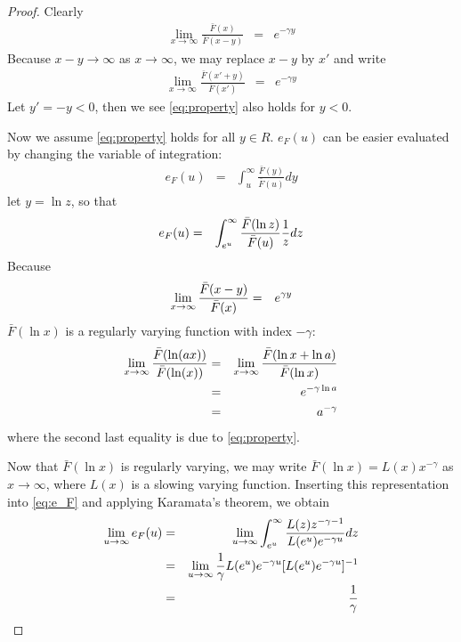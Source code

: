 \documentclass{report}
\begin{document}
\begin{enumerate}[1.]
\begin{enumerate}[(a)]
\begin{proof}
      Clearly
      \begin{eqnarray*}
        \lim_{x \to \infty} \frac{\bar{F}(x)}{\bar{F}(x - y)} &=&
        e^{-\gamma y}      
      \end{eqnarray*}
      Because $x - y \to \infty$ as $x \to \infty$, we may replace $x -
      y$ by $x'$ and write
      \begin{eqnarray*}
        \lim_{x \to \infty} \frac{\bar{F}(x' + y)}{\bar{F}(x')} &=&
        e^{-\gamma y}      
      \end{eqnarray*}
      Let $y' = -y < 0$, then we see \eqref{eq:property} also holds for
      $y < 0$.

      Now we assume \eqref{eq:property} holds for all $y \in
      R$. $e_F(u)$ can be easier evaluated by changing the variable of
      integration:
      \begin{eqnarray*}
        e_F(u) &=& \int_{u}^{\infty} \frac{\bar{F}(y)}{\bar{F}(u)} dy
      \end{eqnarray*}
      let $y = \ln z$, so that
      \begin{eqnarray}
        e_F(u) &=& \int_{e^u}^{\infty} \frac{\bar{F}(\ln
          z)}{\bar{F}(u)}{1 \over z} dz \label{eq:e_F}
      \end{eqnarray}
      Because
      \begin{eqnarray*}
        \lim_{x \to \infty} {\bar{F}(x - y) \over \bar{F}(x)} &=&
        e^{\gamma y}
      \end{eqnarray*}
      $\bar{F}(\ln x)$ is a regularly varying function with index
      $-\gamma$:
      \begin{eqnarray*}
        \lim_{x \to \infty} {\bar{F}(\ln(a x)) \over \bar{F}(\ln(x))}
        &=& \lim_{x \to \infty} {\bar{F}(\ln x + \ln a) \over
          \bar{F}(\ln x)} \\
        &=& e^{-\gamma \ln a} \\
        &=& a^{-\gamma}
      \end{eqnarray*}
      where the second last equality is due to \eqref{eq:property}.

      Now that $\bar{F}(\ln x)$ is regularly varying, we may write
      $\bar{F}(\ln x) = L(x) x^{-\gamma}$ as $x \to \infty$, where
      $L(x)$ is a slowing varying function. Inserting this
      representation into \eqref{eq:e_F} and applying Karamata's
      theorem, we obtain
      \begin{eqnarray*}
        \lim_{u \to \infty} e_F(u) &=& \lim_{u \to \infty}
        \int_{e^u}^{\infty} {L(z) z^{-\gamma - 1} \over L(e^u)
          e^{-\gamma u}} dz \\
        &=& \lim_{u \to \infty} {1 \over
          \gamma} L(e^u) e^{-\gamma u} [L(e^u) e^{-\gamma u}]^{-1} \\
        &=& {1 \over \gamma}
      \end{eqnarray*}
      

\end{proof}
\end{enumerate}
\end{enumerate}
\end{document}
